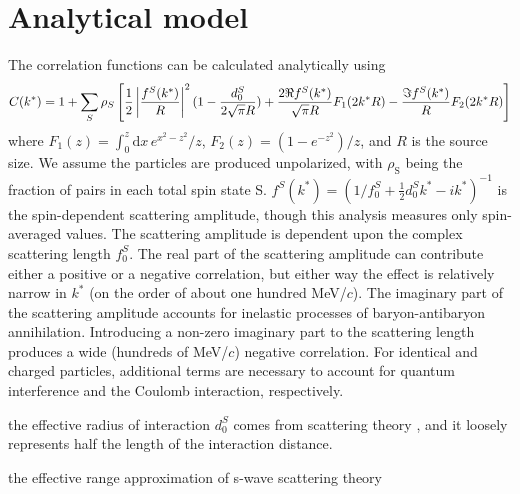 \section{Analytical model}
The correlation functions can be calculated analytically \cite{lednicky82} using 
\begin{equation}
\label{eq:Lednicky}
C(k^*)= 1+ \displaystyle\sum\limits_{S}\rho_S\left[\frac{1}{2}\left\lvert\frac{f^S(k^*)}{R}\right\rvert^2(1-\frac{d_0^S}{2\sqrt{\pi}R})+\frac{2\Re f^S(k^*)}{\sqrt{\pi}R}F_1(2k^*R)-\frac{\Im f^S(k^*)}{R}F_2(2k^*R)\right]
\end{equation}
where $F_1(z) = \int_0^z \! \mathrm{d}x \, e^{x^2-z^2}/z$,  $F_2(z) = (1-e^{-z^2})/z$, and $R$ is the source size. We assume the particles are produced unpolarized, with $\rho_{\mathrm{S}}$ being the fraction of pairs in each total spin state S.  $f^S(k^*)=(1/f_0^S+\frac{1}{2}d_0^Sk^*-ik^*)^{-1}$ is the spin-dependent scattering amplitude, though this analysis measures only spin-averaged values. The scattering amplitude is dependent upon the complex scattering length $f_0^S$.  The real part of the scattering amplitude can contribute either a positive or a negative correlation, but either way the effect is relatively narrow in $k^*$ (on the order of about one hundred MeV/$c$).  The imaginary part of the scattering amplitude accounts for inelastic processes of baryon-antibaryon annihilation.  Introducing a non-zero imaginary part to the scattering length produces a wide (hundreds of MeV/$c$) negative correlation.  For identical and charged particles, additional terms \cite{Aamodt:2011kd} are necessary to account for quantum interference and the Coulomb interaction, respectively.
  
  
  
   the effective radius of interaction $d_0^S$ comes from scattering theory \cite{...}, and it loosely represents half the length of the interaction distance.
   
   the effective range approximation of s-wave scattering theory \cite{...Landau}




